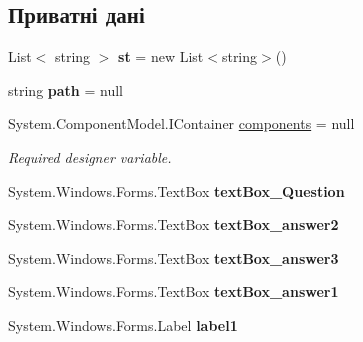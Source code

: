 \subsection*{Приватні дані}
\begin{DoxyCompactItemize}
\item 
List$<$ string $>$ {\bfseries st} = new List$<$string$>$()\hypertarget{class_tests_1_1_adminka_a330050adb0204a625889fb83a3076020}{}\label{class_tests_1_1_adminka_a330050adb0204a625889fb83a3076020}

\item 
string {\bfseries path} = null\hypertarget{class_tests_1_1_adminka_aee4c653fce4f868e0443f71f103073f5}{}\label{class_tests_1_1_adminka_aee4c653fce4f868e0443f71f103073f5}

\item 
System.\+Component\+Model.\+I\+Container \hyperlink{class_tests_1_1_adminka_aa90b2e5b943bff4a2d5f567cd0440ace}{components} = null
\begin{DoxyCompactList}\small\item\em Required designer variable. \end{DoxyCompactList}\item 
System.\+Windows.\+Forms.\+Text\+Box {\bfseries text\+Box\+\_\+\+Question}\hypertarget{class_tests_1_1_adminka_ae9d52a9b2893c5ea478b87306fb97bb5}{}\label{class_tests_1_1_adminka_ae9d52a9b2893c5ea478b87306fb97bb5}

\item 
System.\+Windows.\+Forms.\+Text\+Box {\bfseries text\+Box\+\_\+answer2}\hypertarget{class_tests_1_1_adminka_afff68b1022251085154e49d62a23384c}{}\label{class_tests_1_1_adminka_afff68b1022251085154e49d62a23384c}

\item 
System.\+Windows.\+Forms.\+Text\+Box {\bfseries text\+Box\+\_\+answer3}\hypertarget{class_tests_1_1_adminka_ae3b9da7c9adc45d124cd949d7e36fa49}{}\label{class_tests_1_1_adminka_ae3b9da7c9adc45d124cd949d7e36fa49}

\item 
System.\+Windows.\+Forms.\+Text\+Box {\bfseries text\+Box\+\_\+answer1}\hypertarget{class_tests_1_1_adminka_a6ddfc84b04cb9ee0da0d214993156a13}{}\label{class_tests_1_1_adminka_a6ddfc84b04cb9ee0da0d214993156a13}

\item 
System.\+Windows.\+Forms.\+Label {\bfseries label1}\hypertarget{class_tests_1_1_adminka_a79972d46b6074e3267bc67a0ebb2b469}{}\label{class_tests_1_1_adminka_a79972d46b6074e3267bc67a0ebb2b469}


\end{DoxyCompactItemize}
